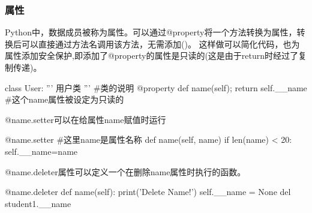 \documentclass{article}
\begin{document}
      \subsubsection{属性}
        Python中，数据成员被称为属性。可以通过@property将一个方法转换为属性，转换后可以直接通过方法名调用该方法，无需添加()。
        这样做可以简化代码，也为属性添加安全保护,即添加了@property的属性是只读的(这是由于return时经过了复制传递)。

        \begin{codeblock}[language=python, caption={property of class}]
          class User: 
              ''' 用户类 ''' #类的说明
              @property
              def name(self);
                  return self.__name #这个name属性被设定为只读的
        \end{codeblock}

        @name.setter可以在给属性name赋值时运行
        \begin{codeblock}[language=python, caption={setter of class}]
          @name.setter #这里name是属性名称
          def name(self, name)
              if len(name) < 20:
                  self.__name=name
        \end{codeblock}

        @name.deleter属性可以定义一个在删除name属性时执行的函数。
        \begin{codeblock}[language=python, caption={deleter}]
          @name.deleter
          def name(self):
              print('Delete Name!')
              self.__name = None
          del student1.__name
        \end{codeblock}
\end{document}
